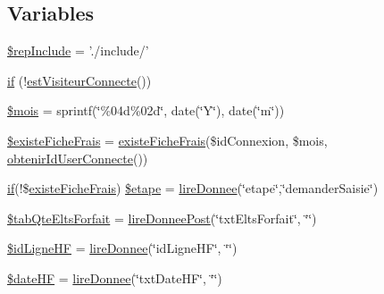 \subsection*{Variables}
\begin{DoxyCompactItemize}
\item 
\hyperlink{c_saisie_fiche_frais_8php_aad2a80747c2de66b59cb18d493ae7a8b}{\$rep\-Include} = './include/'
\item 
\hyperlink{c_saisie_fiche_frais_8php_a5b407bc19b08452156cf04e24ef10ed7}{if} (!\hyperlink{__gestion_session_8lib_8php_afe911e51f16958708b8b700981cd2567}{est\-Visiteur\-Connecte}())
\item 
\hyperlink{c_saisie_fiche_frais_8php_ac3dd350c90be7c45f992a6efde984c66}{\$mois} = sprintf(\char`\"{}\%04d\%02d\char`\"{}, date(\char`\"{}\-Y\char`\"{}), date(\char`\"{}m\char`\"{}))
\item 
\hyperlink{c_saisie_fiche_frais_8php_aa264670a6cc65a3efa2cd5387517ac2b}{\$existe\-Fiche\-Frais} = \hyperlink{__bd_gestion_donnees_8lib_8php_a0e6e5b420aed0486b7a9af7975739787}{existe\-Fiche\-Frais}(\$id\-Connexion, \$mois, \hyperlink{__gestion_session_8lib_8php_a7af627b049f30bda0af2678c3327aff0}{obtenir\-Id\-User\-Connecte}())
\item 
\hyperlink{c_se_connecter_8php_a161e098d41499c163a94c3fa5cd0e698}{if}(!\$\hyperlink{__bd_gestion_donnees_8lib_8php_a0e6e5b420aed0486b7a9af7975739787}{existe\-Fiche\-Frais}) \hyperlink{c_saisie_fiche_frais_8php_af8e2930c82415b5ec01ec03bea717bf3}{\$etape} = \hyperlink{__utilitaires_et_gestion_erreurs_8lib_8php_ab4e61487d300e37e058c1fd31c0446a9}{lire\-Donnee}(\char`\"{}etape\char`\"{},\char`\"{}demander\-Saisie\char`\"{})
\item 
\hyperlink{c_saisie_fiche_frais_8php_a7bbd2a8422d6c9a9d2d236436508e417}{\$tab\-Qte\-Elts\-Forfait} = \hyperlink{__utilitaires_et_gestion_erreurs_8lib_8php_ab0070fc1ef4283caa3457dd5b71a86de}{lire\-Donnee\-Post}(\char`\"{}txt\-Elts\-Forfait\char`\"{}, \char`\"{}\char`\"{})
\item 
\hyperlink{c_saisie_fiche_frais_8php_a08c2ee78af26f9f01097c208a92dccb6}{\$id\-Ligne\-H\-F} = \hyperlink{__utilitaires_et_gestion_erreurs_8lib_8php_ab4e61487d300e37e058c1fd31c0446a9}{lire\-Donnee}(\char`\"{}id\-Ligne\-H\-F\char`\"{}, \char`\"{}\char`\"{})
\item 
\hyperlink{c_saisie_fiche_frais_8php_a6d93c38f9d39412ede016aff941c4476}{\$date\-H\-F} = \hyperlink{__utilitaires_et_gestion_erreurs_8lib_8php_ab4e61487d300e37e058c1fd31c0446a9}{lire\-Donnee}(\char`\"{}txt\-Date\-H\-F\char`\"{}, \char`\"{}\char`\"{})

\end{DoxyCompactItemize}
